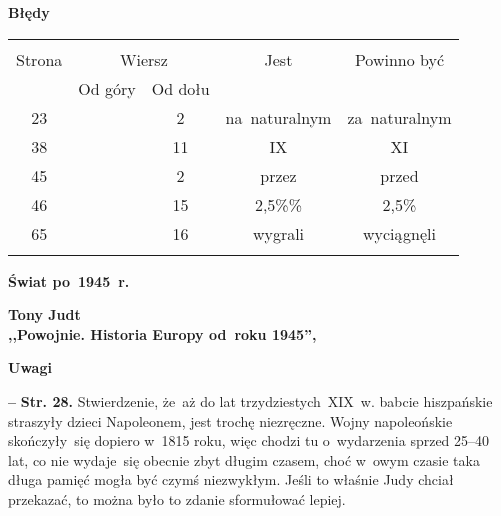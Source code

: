 \documentclass[a4paper,11pt]{article}
\newcommand{\spaceOne}{2em}
\newcommand{\spaceThree}{0.5em}
\newcommand{\tb}{\textbf}
\newcommand{\noi}{\noindent}
\newcommand{\start}{\noi \tb{--} {}}
\newcommand{\Center}[1]{\begin{center} #1 \end{center}}
\newcommand{\CenterTB}[1]{\Center{\tb{#1}}}
\newcommand{\Str}[1]{\tb{Str. #1.}}
\newcommand{\StrWd}[2]{\tb{Str. #1, wiersz #2 (od dołu).}}
\newcommand{\Field}[1]{ \begin{center} {\Large \tb{#1} } \end{center} }
\newcommand{\Work}[1]{ \begin{center} {\large \tb{#1}} \end{center} }
\begin{document}




\CenterTB{Błędy}
\begin{center}
  \begin{tabular}{|c|c|c|c|c|}
    \hline
    & \multicolumn{2}{c|}{} & & \\
    Strona & \multicolumn{2}{c|}{Wiersz}& Jest & Powinno być \\ \cline{2-3}
    & Od góry & Od dołu &  &  \\ \hline
    23 & & 2 & na~naturalnym & za~naturalnym \\
    38 & & 11 & IX & XI \\
    45 & & 2 & przez & przed \\
    46 & & 15 & 2,5\%\% & 2,5\% \\
    65 & & 16 & wygrali & wyciągnęli \\
    & & & & \\ \hline
  \end{tabular}
\end{center}

\vspace{\spaceOne}




\newpage
\Field{Świat po~1945~r.}

\vspace{\spaceThree}



\Work{
  Tony Judt \\
  ,,Powojnie. Historia Europy od~roku 1945'', \cite{Judt16} }


\CenterTB{Uwagi}

\start \Str{28} Stwierdzenie, że~aż do lat trzydziestych~XIX~w. babcie
hiszpańskie straszyły dzieci Napoleonem, jest trochę niezręczne. Wojny
napoleońskie skończyły~się dopiero w~1815 roku, więc chodzi tu
o~wydarzenia sprzed 25--40 lat, co nie wydaje~się obecnie zbyt długim
czasem, choć w~owym czasie taka długa pamięć mogła być czymś
niezwykłym. Jeśli to właśnie Judy chciał przekazać, to można było to
zdanie sformułować lepiej.
\end{document}
